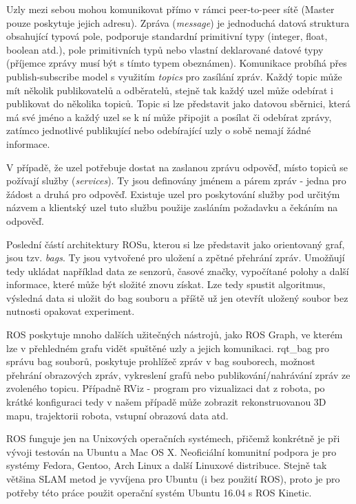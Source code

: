 \documentclass[12pt,a4paper]{report}
\begin{document}
Uzly mezi sebou mohou komunikovat přímo v rámci peer-to-peer sítě (Master pouze poskytuje jejich adresu). Zpráva (\textit{message}) je jednoduchá datová struktura obsahující typová pole, podporuje standardní primitivní typy (integer, float, boolean atd.), pole primitivních typů nebo vlastní deklarované datové typy (příjemce zprávy musí být s tímto typem obeznámen). Komunikace probíhá přes publish-subscribe model s využitím \textit{topics} pro zasílání zpráv. Každý topic může mít několik publikovatelů a odběratelů, stejně tak každý uzel může odebírat i publikovat do několika topiců. Topic si lze představit jako datovou sběrnici, která má své jméno a každý uzel se k ní může připojit a posílat či odebírat zprávy, zatímco jednotlivé publikující nebo odebírající uzly o sobě nemají žádné informace. 

V případě, že uzel potřebuje dostat na zaslanou zprávu odpověď, místo topiců se požívají služby (\textit{services}). Ty jsou definovány jménem a párem zpráv - jedna pro žádost a druhá pro odpověď. Existuje uzel pro poskytování služby pod určitým názvem a klientský uzel tuto službu použije zasláním požadavku a čekáním na odpověď.

Poslední částí architektury ROSu, kterou si lze představit jako orientovaný graf, jsou tzv. \textit{bags}. Ty jsou vytvořené pro uložení a zpětné přehrání zpráv. Umožňují tedy ukládat například data ze senzorů, časové značky, vypočítané polohy a další informace, které může být složité znovu získat. Lze tedy spustit algoritmus, výsledná data si uložit do bag souboru a příště už jen otevřít uložený soubor bez nutnosti opakovat experiment.

ROS poskytuje mnoho dalších užitečných nástrojů, jako ROS Graph, ve kterém lze v přehledném grafu vidět spuštěné uzly a jejich komunikaci. rqt\_bag pro správu bag souborů, poskytuje prohlížeč zpráv v bag souborech, možnost přehrání obrazových zpráv, vykreslení grafů nebo publikování/nahrávání zpráv ze zvoleného topicu. Případně RViz - program pro vizualizaci dat z robota, po krátké konfiguraci tedy v našem případě může zobrazit rekonstruovanou 3D mapu, trajektorii robota, vstupní obrazová data atd.

ROS funguje jen na Unixových operačních systémech, přičemž konkrétně je při vývoji testován na Ubuntu a Mac OS X. Neoficiální komunitní podpora je pro systémy Fedora, Gentoo, Arch Linux a další Linuxové distribuce. Stejně tak většina SLAM metod je vyvíjena pro Ubuntu (i bez použití ROS), proto je pro potřeby této práce použit operační systém Ubuntu 16.04 s ROS Kinetic.
\end{document}
